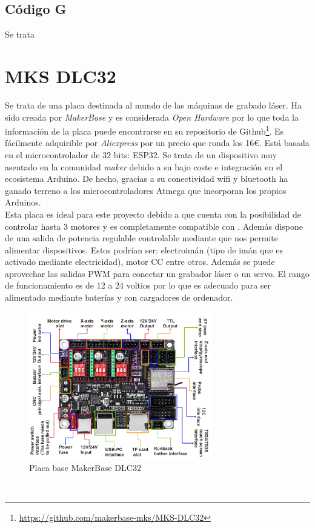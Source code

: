 \subsection{Código G}
\label{sec:gcode}
Se trata 

\section{MKS DLC32}
\label{subsec:mksdlc32}
Se trata de una placa destinada al mundo de las máquinas de grabado láser. Ha sido creada por \textit{MakerBase} y es considerada 
\textit{Open Hardware} por lo que toda la información de la placa puede encontrarse en su repositorio de Github\footnote{\url{https://github.com/makerbase-mks/MKS-DLC32}}.
Es fácilmente adquirible por \textit{Aliexpress} por un precio que ronda los 16\euro. Está basada en el microcontrolador de 32 bits: ESP32. 
Se trata de un dispositivo muy asentado en la comunidad \textit{maker} debido a su bajo coste e integración en el 
ecosistema Arduino. De hecho, gracias a su conectividad wifi y bluetooth ha ganado terreno a los microcontroladores Atmega que incorporan los propios Arduinos.\\
Esta placa es ideal para este proyecto debido a que cuenta con la posibilidad de controlar 
hasta 3 motores y es completamente compatible con . Además dispone de una salida de potencia regulable controlable mediante  que nos 
permite alimentar dispositivos. Estos podrían ser: electroimán (tipo de imán que es activado mediante electricidad), motor \ac{CC} entre otros. Además se puede aprovechar las salidas \ac{PWM} para conectar un grabador láser o un servo. 
El rango de funcionamiento es de 12 a 24 voltios por lo que es adecuado para ser alimentado mediante baterías y con cargadores de ordenador. 
\begin{figure} [h!]
    \begin{center}
      \includegraphics[width=8cm]{figs/MKS.png}
    \end{center}
    \caption{Placa base MakerBase DLC32}
    \label{fig:robSoldering}
  \end{figure}\ 

